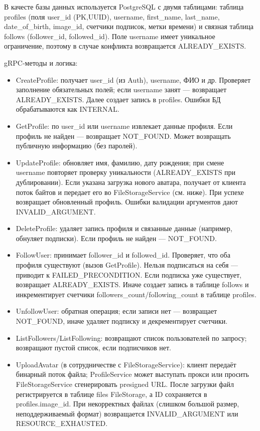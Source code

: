 В качесте базы данных используется PostgreSQL с двумя таблицами: таблица profiles (поля user\_id (PK,UUID), username, first\_name, last\_name, \\ date\_of\_birth, image\_id, счетчики подписок, метки времени) и связная таблица follows (follower\_id, followed\_id). Поле username имеет уникальное ограничение, поэтому в случае конфликта возвращается ALREADY\_EXISTS.

gRPC-методы и логика:
\begin{itemize}
    \item CreateProfile: получает user\_id (из Auth), username, ФИО и др. Проверяет заполнение обязательных полей; если username занят — возвращает ALREADY\_EXISTS. Далее создает запись в profiles. Ошибки БД обрабатываются как INTERNAL.
    \item GetProfile: по user\_id или username извлекает данные профиля. Если профиль не найден — возвращает NOT\_FOUND. Может возвращать публичную информацию (без паролей).
    \item UpdateProfile: обновляет имя, фамилию, дату рождения; при смене \\ username повторяет проверку уникальности (ALREADY\_EXISTS при дублировании). Если указана загрузка нового аватара, получает от клиента поток байтов и передает его во FileStorageService (см. ниже). При успехе возвращает обновленный профиль. Ошибки валидации аргументов дают INVALID\_ARGUMENT.
    \item DeleteProfile: удаляет запись профиля и связанные данные (например, обнуляет подписки). Если профиль не найден — NOT\_FOUND.
    \item FollowUser: принимает follower\_id и followed\_id. Проверяет, что оба профиля существуют (вызов GetProfile). Нельзя подписаться на себя — приводит к FAILED\_PRECONDITION. Если подписка уже существует, возвращает ALREADY\_EXISTS. Иначе создает запись в таблице follows и инкрементирует счетчики followers\_count/following\_count в таблице profiles.
    \item UnfollowUser: обратная операция; если записи нет — возвращает\\ NOT\_FOUND, иначе удаляет подписку и декрементирует счетчики.
    \item ListFollowers/ListFollowing: возвращают список пользователей по запросу; возвращают пустой список, если подписчиков нет.
    \item UploadAvatar (в сотрудничестве с FileStorageService): клиент передаёт бинарный поток файла; ProfileService может выступать прокси или просить FileStorageService сгенерировать presigned URL. После загрузки файл регистрируется в таблице files FileStorage, а ID сохраняется в profiles.image\_id. При некорректных файлах (слишком большой размер, неподдерживаемый формат) возвращается INVALID\_ARGUMENT или RESOURCE\_EXHAUSTED.
\end{itemize}
